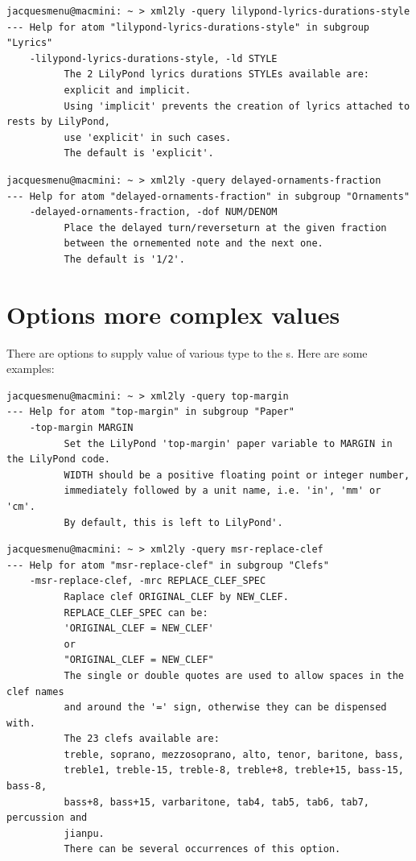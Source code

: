 \begin{lstlisting}[language=Terminal]
jacquesmenu@macmini: ~ > xml2ly -query lilypond-lyrics-durations-style
--- Help for atom "lilypond-lyrics-durations-style" in subgroup "Lyrics"
    -lilypond-lyrics-durations-style, -ld STYLE
          The 2 LilyPond lyrics durations STYLEs available are:
          explicit and implicit.
          Using 'implicit' prevents the creation of lyrics attached to rests by LilyPond,
          use 'explicit' in such cases.
          The default is 'explicit'.
\end{lstlisting}

\begin{lstlisting}[language=Terminal]
jacquesmenu@macmini: ~ > xml2ly -query delayed-ornaments-fraction
--- Help for atom "delayed-ornaments-fraction" in subgroup "Ornaments"
    -delayed-ornaments-fraction, -dof NUM/DENOM
          Place the delayed turn/reverseturn at the given fraction
          between the ornemented note and the next one.
          The default is '1/2'.
\end{lstlisting}


\section{Options more complex values}\label{Options more complex values}

There are options to supply value of various type to the \service s. Here are some examples:
\begin{lstlisting}[language=Terminal]
jacquesmenu@macmini: ~ > xml2ly -query top-margin
--- Help for atom "top-margin" in subgroup "Paper"
    -top-margin MARGIN
          Set the LilyPond 'top-margin' paper variable to MARGIN in the LilyPond code.
          WIDTH should be a positive floating point or integer number,
          immediately followed by a unit name, i.e. 'in', 'mm' or 'cm'.
          By default, this is left to LilyPond'.
\end{lstlisting}

\begin{lstlisting}[language=Terminal]
jacquesmenu@macmini: ~ > xml2ly -query msr-replace-clef
--- Help for atom "msr-replace-clef" in subgroup "Clefs"
    -msr-replace-clef, -mrc REPLACE_CLEF_SPEC
          Raplace clef ORIGINAL_CLEF by NEW_CLEF.
          REPLACE_CLEF_SPEC can be:
          'ORIGINAL_CLEF = NEW_CLEF'
          or
          "ORIGINAL_CLEF = NEW_CLEF"
          The single or double quotes are used to allow spaces in the clef names
          and around the '=' sign, otherwise they can be dispensed with.
          The 23 clefs available are:
          treble, soprano, mezzosoprano, alto, tenor, baritone, bass,
          treble1, treble-15, treble-8, treble+8, treble+15, bass-15, bass-8,
          bass+8, bass+15, varbaritone, tab4, tab5, tab6, tab7, percussion and
          jianpu.
          There can be several occurrences of this option.
\end{lstlisting}


